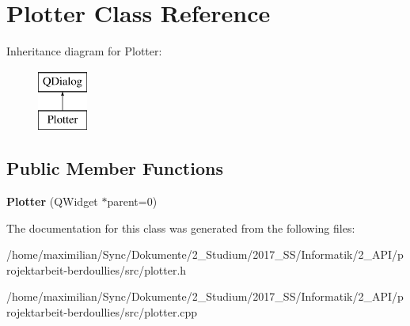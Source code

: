 \hypertarget{class_plotter}{}\section{Plotter Class Reference}
\label{class_plotter}
Inheritance diagram for Plotter\+:\begin{figure}[H]
\begin{center}
\leavevmode
\includegraphics[height=2.000000cm]{class_plotter}
\end{center}
\end{figure}
\subsection*{Public Member Functions}
\begin{DoxyCompactItemize}
\item 
\mbox{\label{class_plotter_a367b6890c36910a27ec710ac3693e64b}} 
{\bfseries Plotter} (Q\+Widget $\ast$parent=0)
\end{DoxyCompactItemize}


The documentation for this class was generated from the following files\+:\begin{DoxyCompactItemize}
\item 
/home/maximilian/\+Sync/\+Dokumente/2\+\_\+\+Studium/2017\+\_\+\+S\+S/\+Informatik/2\+\_\+\+A\+P\+I/projektarbeit-\/berdoullies/src/plotter.\+h\item 
/home/maximilian/\+Sync/\+Dokumente/2\+\_\+\+Studium/2017\+\_\+\+S\+S/\+Informatik/2\+\_\+\+A\+P\+I/projektarbeit-\/berdoullies/src/plotter.\+cpp\end{DoxyCompactItemize}
